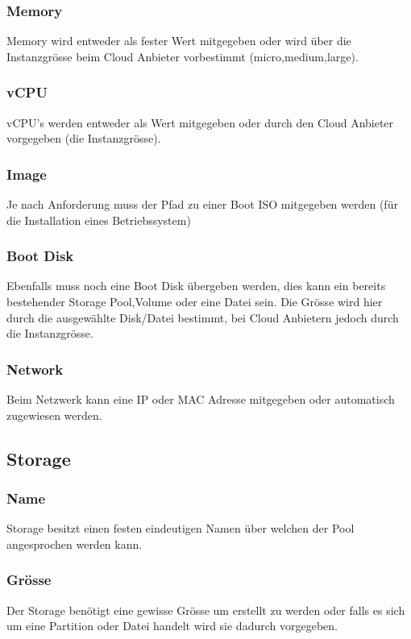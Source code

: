 \documentclass[11pt]{scrartcl}
\begin{document}
\subsubsection{Memory}
Memory wird entweder als fester Wert mitgegeben oder wird über die Instanzgrösse 
beim Cloud Anbieter vorbestimmt (micro,medium,large).

\subsubsection{vCPU}
vCPU's werden entweder als Wert mitgegeben oder durch den Cloud Anbieter vorgegeben (die Instanzgrösse). 

\subsubsection{Image}
Je nach Anforderung muss der Pfad zu einer Boot ISO mitgegeben werden (für die Installation eines 
Betriebssystem) 

\subsubsection{Boot Disk}
Ebenfalls muss noch eine Boot Disk übergeben werden, dies kann ein bereits 
bestehender Storage Pool,Volume oder eine Datei sein.
Die Grösse wird hier durch die ausgewählte Disk/Datei bestimmt, bei Cloud 
Anbietern jedoch durch die Instanzgrösse.

\subsubsection{Network}
Beim Netzwerk kann eine IP oder MAC Adresse mitgegeben oder automatisch zugewiesen 
werden.

\subsection{Storage}
\subsubsection{Name}
Storage besitzt einen festen eindeutigen Namen über welchen der Pool angesprochen 
werden kann.
\subsubsection{Grösse}
Der Storage benötigt eine gewisse Grösse um erstellt zu werden oder falls es 
sich um eine Partition oder Datei handelt wird sie dadurch vorgegeben.
\end{document}
